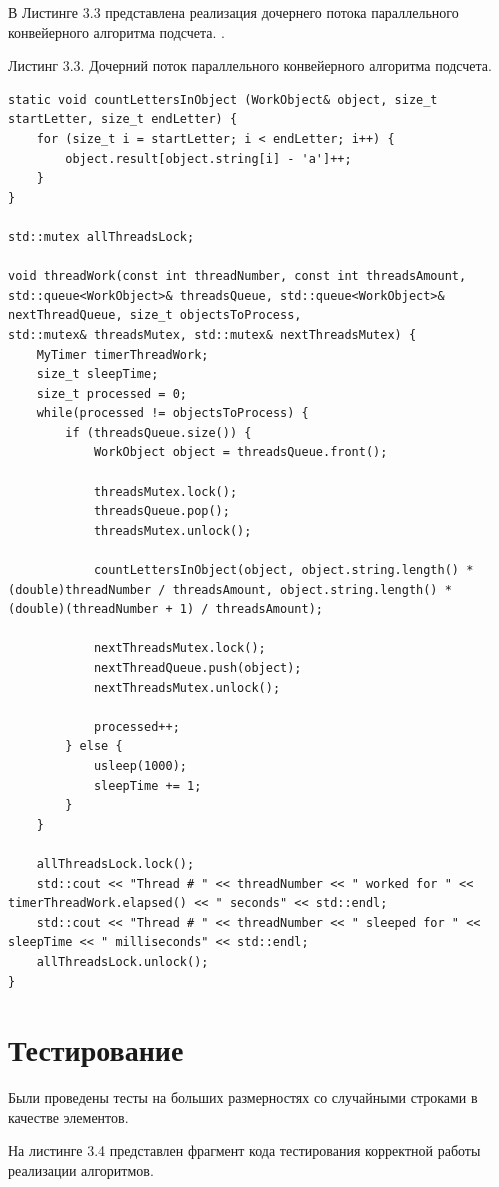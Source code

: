 \documentclass[12pt]{report}
\begin{document}
В Листинге 3.3 представлена реализация дочернего потока параллельного конвейерного алгоритма подсчета.
.
\begin{flushleft}
Листинг 3.3. Дочерний поток параллельного конвейерного алгоритма подсчета.
\begin{lstlisting}
static void countLettersInObject (WorkObject& object, size_t startLetter, size_t endLetter) {
	for (size_t i = startLetter; i < endLetter; i++) {
		object.result[object.string[i] - 'a']++;
	}
}

std::mutex allThreadsLock;

void threadWork(const int threadNumber, const int threadsAmount, std::queue<WorkObject>& threadsQueue, std::queue<WorkObject>& nextThreadQueue, size_t objectsToProcess,
std::mutex& threadsMutex, std::mutex& nextThreadsMutex) {
	MyTimer timerThreadWork;
	size_t sleepTime;
	size_t processed = 0;
	while(processed != objectsToProcess) {
		if (threadsQueue.size()) {
			WorkObject object = threadsQueue.front();
			
			threadsMutex.lock();
			threadsQueue.pop();
			threadsMutex.unlock();
			
			countLettersInObject(object, object.string.length() * (double)threadNumber / threadsAmount, object.string.length() * (double)(threadNumber + 1) / threadsAmount);
			
			nextThreadsMutex.lock();
			nextThreadQueue.push(object);
			nextThreadsMutex.unlock();
			
			processed++;
		} else {
			usleep(1000);
			sleepTime += 1;
		}
	}
	
	allThreadsLock.lock();
	std::cout << "Thread # " << threadNumber << " worked for " << timerThreadWork.elapsed() << " seconds" << std::endl;
	std::cout << "Thread # " << threadNumber << " sleeped for " << sleepTime << " milliseconds" << std::endl;
	allThreadsLock.unlock();
}
\end{lstlisting}
\end{flushleft}
	
\section{Тестирование}
Были проведены тесты на больших размерностях со случайными строками в качестве элементов.
\vspace{\baselineskip}

На листинге 3.4 представлен фрагмент кода тестирования корректной работы реализации алгоритмов.
\end{document}

